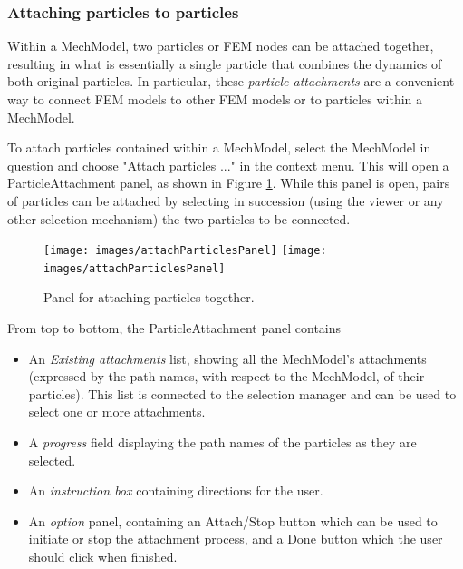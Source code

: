 \documentclass{article}
\begin{document}
\subsubsection{Attaching particles to particles}
\label{particleParticleAttachmentSec}

Within a MechModel, two particles or FEM nodes can be attached
together, resulting in what is essentially a single particle that
combines the dynamics of both original particles. In particular, these
{\it particle attachments} are a convenient way to connect FEM models to
other FEM models or to particles within a MechModel.

To attach particles contained within a MechModel, select the MechModel in
question and choose {\sf "Attach particles ..."} in the context menu. This
will open a ParticleAttachment panel, as shown in
Figure \ref{attachParticlesPanelFig}. While this panel is open, pairs of particles
can be attached by selecting in succession (using the viewer or any
other selection mechanism) the two particles to be connected.

\begin{figure}
\begin{center}
\iflatexml
\texttt{[image: images/attachParticlesPanel]}
\else
\texttt{[image: images/attachParticlesPanel]}
\fi
\end{center}
\caption{Panel for attaching particles together.}%
\label{attachParticlesPanelFig}
\end{figure}

From top to bottom, the ParticleAttachment  panel contains

\begin{itemize}

\item An {\it Existing attachments} list, showing all the MechModel's
attachments (expressed by the path names, with respect to the
MechModel, of their particles). This list is connected to the
selection manager and can be used to select one or more attachments.

\item A {\it progress} field displaying the path names of the particles as
they are selected.

\item An {\it instruction box} containing directions for the user.

\item An {\it option} panel, containing an {\sf Attach/Stop} 
button which can be used
to initiate or stop the attachment process, and a {\sf Done} button which
the user should click when finished.

\end{itemize}
\end{document}

